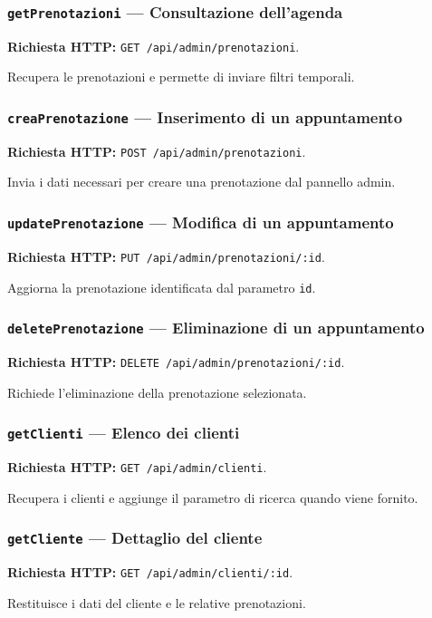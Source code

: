 \documentclass[12pt,a4paper]{article}
\begin{document}
\subsubsection{\texttt{getPrenotazioni} --- Consultazione dell'agenda}
\textbf{Richiesta HTTP:} \texttt{GET /api/admin/prenotazioni}.

Recupera le prenotazioni e permette di inviare filtri temporali.

\subsubsection{\texttt{creaPrenotazione} --- Inserimento di un appuntamento}
\textbf{Richiesta HTTP:} \texttt{POST /api/admin/prenotazioni}.

Invia i dati necessari per creare una prenotazione dal pannello admin.

\subsubsection{\texttt{updatePrenotazione} --- Modifica di un appuntamento}
\textbf{Richiesta HTTP:} \texttt{PUT /api/admin/prenotazioni/:id}.

Aggiorna la prenotazione identificata dal parametro \texttt{id}.

\subsubsection{\texttt{deletePrenotazione} --- Eliminazione di un appuntamento}
\textbf{Richiesta HTTP:} \texttt{DELETE /api/admin/prenotazioni/:id}.

Richiede l'eliminazione della prenotazione selezionata.

\subsubsection{\texttt{getClienti} --- Elenco dei clienti}
\textbf{Richiesta HTTP:} \texttt{GET /api/admin/clienti}.

Recupera i clienti e aggiunge il parametro di ricerca quando viene fornito.

\subsubsection{\texttt{getCliente} --- Dettaglio del cliente}
\textbf{Richiesta HTTP:} \texttt{GET /api/admin/clienti/:id}.

Restituisce i dati del cliente e le relative prenotazioni.
\end{document}
